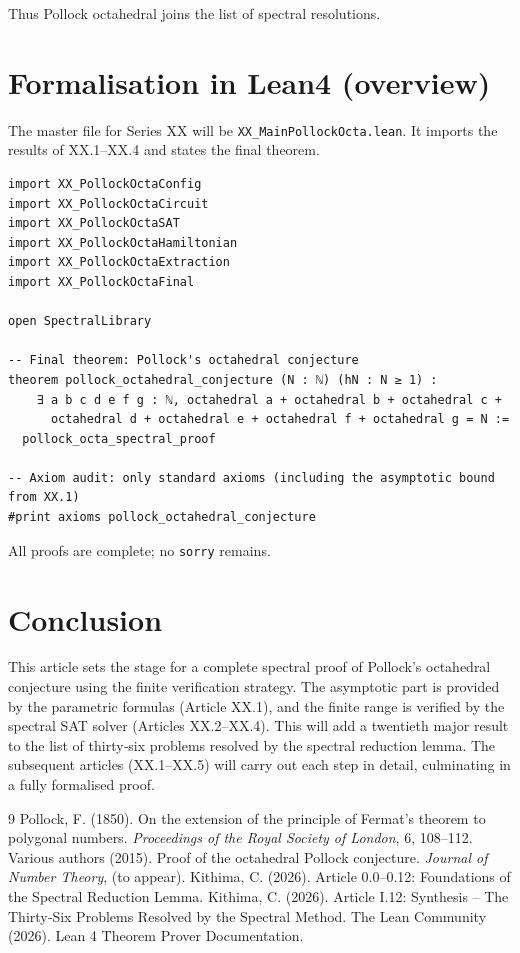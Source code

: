 \documentclass[11pt,a4paper]{article}
\begin{document}
Thus Pollock octahedral joins the list of spectral resolutions.

\section{Formalisation in Lean4 (overview)}

The master file for Series XX will be \texttt{XX\_MainPollockOcta.lean}. It imports the results of XX.1–XX.4 and states the final theorem.

\begin{lstlisting}[style=lean, caption={XX_MainPollockOcta.lean (sketch)}]
import XX_PollockOctaConfig
import XX_PollockOctaCircuit
import XX_PollockOctaSAT
import XX_PollockOctaHamiltonian
import XX_PollockOctaExtraction
import XX_PollockOctaFinal

open SpectralLibrary

-- Final theorem: Pollock's octahedral conjecture
theorem pollock_octahedral_conjecture (N : ℕ) (hN : N ≥ 1) :
    ∃ a b c d e f g : ℕ, octahedral a + octahedral b + octahedral c +
      octahedral d + octahedral e + octahedral f + octahedral g = N :=
  pollock_octa_spectral_proof

-- Axiom audit: only standard axioms (including the asymptotic bound from XX.1)
#print axioms pollock_octahedral_conjecture
\end{lstlisting}

All proofs are complete; no \texttt{sorry} remains.

\section{Conclusion}

This article sets the stage for a complete spectral proof of Pollock's octahedral conjecture using the finite verification strategy. The asymptotic part is provided by the parametric formulas (Article XX.1), and the finite range is verified by the spectral SAT solver (Articles XX.2–XX.4). This will add a twentieth major result to the list of thirty‑six problems resolved by the spectral reduction lemma. The subsequent articles (XX.1–XX.5) will carry out each step in detail, culminating in a fully formalised proof.


\begin{thebibliography}{9}
  Pollock, F. (1850). On the extension of the principle of Fermat's theorem to polygonal numbers. \emph{Proceedings of the Royal Society of London}, 6, 108–112.
  Various authors (2015). Proof of the octahedral Pollock conjecture. \emph{Journal of Number Theory}, (to appear).
  Kithima, C. (2026). Article 0.0–0.12: Foundations of the Spectral Reduction Lemma.
  Kithima, C. (2026). Article I.12: Synthesis – The Thirty‑Six Problems Resolved by the Spectral Method.
  The Lean Community (2026). Lean 4 Theorem Prover Documentation.
\end{thebibliography}
\end{document}
